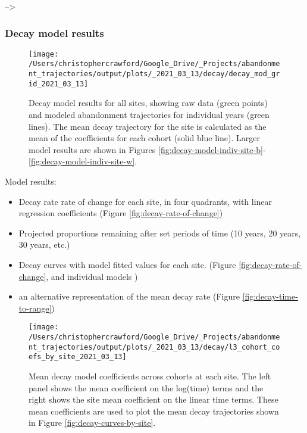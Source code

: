 \documentclass[9pt,twocolumn,twoside,]{pnas-new}
\providecommand{\tightlist}{%
  \setlength{\itemsep}{0pt}\setlength{\parskip}{0pt}}
\begin{document}
--\textgreater{}

\hypertarget{decay-model-results}{%
\subsubsection{Decay model results}\label{decay-model-results}}



\begin{figure}
\texttt{[image: /Users/christophercrawford/Google\_Drive/\_Projects/abandonment\_trajectories/output/plots/\_2021\_03\_13/decay/decay\_mod\_grid\_2021\_03\_13]} \caption{Decay model results for all sites, showing raw data (green points) and modeled abandonment trajectories for individual years (green lines). The mean decay trajectory for the site is calculated as the mean of the coefficients for each cohort (solid blue line). Larger model results are shown in Figures \ref{fig:decay-model-indiv-site-b}-\ref{fig:decay-model-indiv-site-w}.}\label{fig:decay-model-grid}
\end{figure}

Model results:

\begin{itemize}
\tightlist
\item
  Decay rate rate of change for each site, in four quadrants, with linear regression coefficients (Figure \ref{fig:decay-rate-of-change})
\item
  Projected proportions remaining after set periods of time (10 years, 20 years, 30 years, etc.)
\item
  Decay curves with model fitted values for each site. (Figure \ref{fig:decay-rate-of-change}, and individual models )
\item
  an alternative representation of the mean decay rate (Figure \ref{fig:decay-time-to-range})
\end{itemize}



\begin{figure}
\texttt{[image: /Users/christophercrawford/Google\_Drive/\_Projects/abandonment\_trajectories/output/plots/\_2021\_03\_13/decay/l3\_cohort\_coefs\_by\_site\_2021\_03\_13]} \caption{Mean decay model coefficients across cohorts at each site. The left panel shows the mean coefficient on the log(time) terms and the right shows the site mean coefficient on the linear time terms. These mean coefficients are used to plot the mean decay trajectories shown in Figure \ref{fig:decay-curves-by-site}.}\label{fig:decay-mod-coef}
\end{figure}
\end{document}
